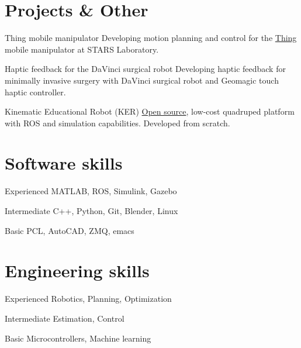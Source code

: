 \documentclass{tccv}
\begin{document}
\section{Projects \& Other}
\begin{yearlist2}
\item{}
     {\small Thing mobile manipulator}
     {{\small Developing motion planning and control for the \href{https://youtu.be/l_MliB_B_UQ}{Thing} mobile manipulator at STARS Laboratory.}}
     
\item{}
     {\small Haptic feedback for the DaVinci surgical robot} 
     {{\small Developing haptic feedback for minimally invasive surgery with DaVinci surgical robot and Geomagic touch haptic controller.}}

     \item{}
     {\small Kinematic Educational Robot (KER)}
     {{\small \href{https://github.com/filipmrc/ker}{Open source}, low-cost quadruped platform with ROS and simulation capabilities. Developed from scratch.}}
\end{yearlist2}
\vspace*{-0.5cm}
%
\section{Software skills}
\begin{factlist}

\item{Experienced}
     {MATLAB, ROS, Simulink, Gazebo}

\item{Intermediate}
     {C++, Python, Git, Blender, Linux} %

\item{Basic}
     {PCL, AutoCAD, ZMQ, emacs}
\end{factlist}
\vspace*{-0.5cm} 
%
\section{Engineering skills}
\begin{factlist}
\item{Experienced}
	 {Robotics, Planning, Optimization}
	 
\item{Intermediate}
     {Estimation, Control}
    
\item{Basic}
     {Microcontrollers, Machine learning} 
\end{factlist}
\vspace*{-0.5cm}
%
\end{document}
